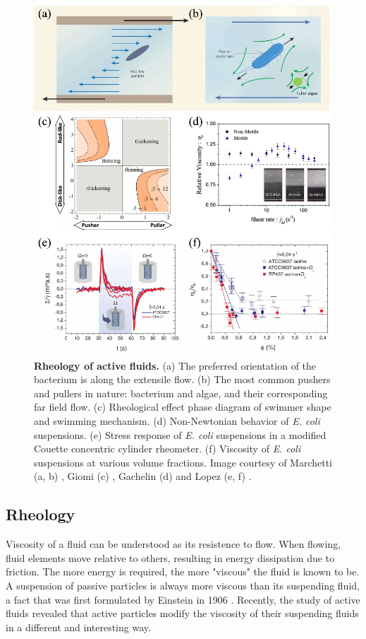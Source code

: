 \begin{figure}[!htbp]
	\begin{center}
	\includegraphics[width=5.5 in]{Figs/1-Intro/2.pdf}
	\end{center}
	\caption[Figure 1.2: ]
	{
	\textbf{Rheology of active fluids.}
	(a) The preferred orientation of the bacterium is along the extensile flow.
	(b) The most common pushers and pullers in nature: bacterium and algae, and their corresponding far field flow.
	(c) Rheological effect phase diagram of swimmer shape and swimming mechanism.
	(d) Non-Newtonian behavior of \textit{E. coli} suspensions.
	(e) Stress response of \textit{E. coli} suspensions in a modified Couette concentric cylinder rheometer.
	(f) Viscosity of \textit{E. coli} suspensions at various volume fractions.
	Image courtesy of Marchetti (a, b) \cite{Marchetti2015}, Giomi (c) \cite{Giomi2010}, Gachelin (d) \cite{Gachelin2013} and Lopez (e, f) \cite{Lopez2015}.
	}
	\label{fig:rheology-of-active-fluids}
\end{figure}

\subsection{Rheology}
\label{sec:rheology}
Viscosity of a fluid can be understood as its resistence to flow. When flowing, fluid elements move relative to others, resulting in energy dissipation due to friction. The more energy is required, the more "viscous" the fluid is known to be. A suspension
of passive particles is always more viscous than its suspending fluid, a fact that was first formulated by Einstein in 1906 \cite{Einstein1906}. Recently, the study of active fluids revealed that active particles modify the viscosity of their suspending fluids in a different and interesting way.

